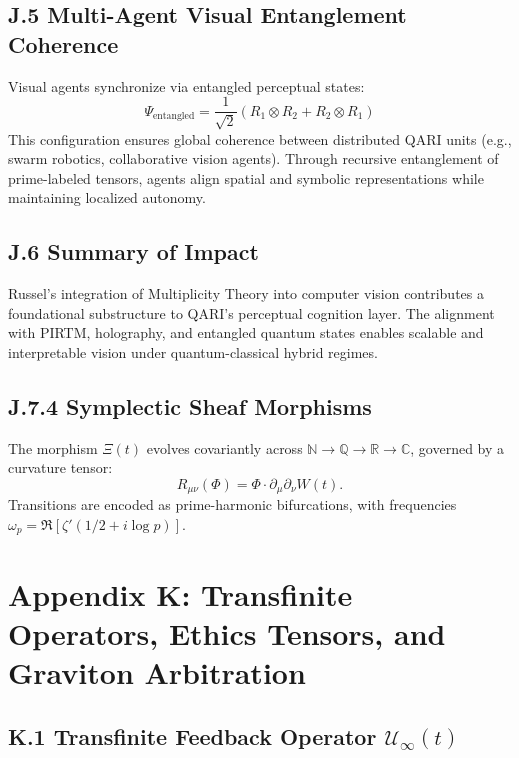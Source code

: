 \documentclass[12pt]{article}
\begin{document}
\begin{itemize}
\subsection*{J.5 Multi-Agent Visual Entanglement Coherence}

Visual agents synchronize via entangled perceptual states:
\[
\Psi_{\text{entangled}} = \frac{1}{\sqrt{2}}(R_1 \otimes R_2 + R_2 \otimes R_1)
\]
This configuration ensures global coherence between distributed QARI units (e.g., swarm robotics, collaborative vision agents). Through recursive entanglement of prime-labeled tensors, agents align spatial and symbolic representations while maintaining localized autonomy.

\subsection*{J.6 Summary of Impact}

Russel's integration of Multiplicity Theory into computer vision contributes a foundational substructure to QARI’s perceptual cognition layer. The alignment with PIRTM, holography, and entangled quantum states enables scalable and interpretable vision under quantum-classical hybrid regimes.

\subsection*{J.7.4 Symplectic Sheaf Morphisms}
The morphism \(\Xi(t)\) evolves covariantly across \(\mathbb{N} \to \mathbb{Q} \to \mathbb{R} \to \mathbb{C}\), governed by a curvature tensor:
\[
R_{\mu\nu}(\Phi) = \Phi \cdot \partial_{\mu} \partial_{\nu} W(t).
\]
Transitions are encoded as prime-harmonic bifurcations, with frequencies \(\omega_p = \Re[\zeta'(1/2 + i \log p)]\).
\appendix
\section*{Appendix K: Transfinite Operators, Ethics Tensors, and Graviton Arbitration}

\subsection*{K.1 \quad Transfinite Feedback Operator \( \mathcal{U}_\infty(t) \)}


\end{itemize}
\end{document}
